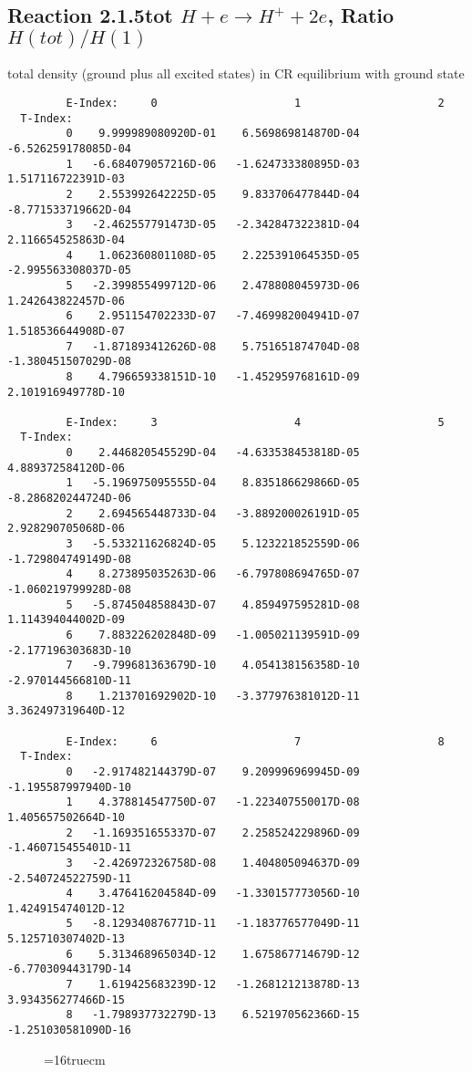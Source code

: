 \documentclass[12pt,dvipdfmx]{article}
\begin{document}
\newpage
\subsection{
Reaction 2.1.5tot $ H + e \rightarrow H^+ + 2e$, Ratio $H(tot)/H(1)$
}

total density (ground plus all excited states) in CR equilibrium with ground state

\begin{small}\begin{verbatim}
         E-Index:     0                     1                     2
  T-Index:
         0    9.999989080920D-01    6.569869814870D-04   -6.526259178085D-04
         1   -6.684079057216D-06   -1.624733380895D-03    1.517116722391D-03
         2    2.553992642225D-05    9.833706477844D-04   -8.771533719662D-04
         3   -2.462557791473D-05   -2.342847322381D-04    2.116654525863D-04
         4    1.062360801108D-05    2.225391064535D-05   -2.995563308037D-05
         5   -2.399855499712D-06    2.478808045973D-06    1.242643822457D-06
         6    2.951154702233D-07   -7.469982004941D-07    1.518536644908D-07
         7   -1.871893412626D-08    5.751651874704D-08   -1.380451507029D-08
         8    4.796659338151D-10   -1.452959768161D-09    2.101916949778D-10

         E-Index:     3                     4                     5
  T-Index:
         0    2.446820545529D-04   -4.633538453818D-05    4.889372584120D-06
         1   -5.196975095555D-04    8.835186629866D-05   -8.286820244724D-06
         2    2.694565448733D-04   -3.889200026191D-05    2.928290705068D-06
         3   -5.533211626824D-05    5.123221852559D-06   -1.729804749149D-08
         4    8.273895035263D-06   -6.797808694765D-07   -1.060219799928D-08
         5   -5.874504858843D-07    4.859497595281D-08    1.114394044002D-09
         6    7.883226202848D-09   -1.005021139591D-09   -2.177196303683D-10
         7   -9.799681363679D-10    4.054138156358D-10   -2.970144566810D-11
         8    1.213701692902D-10   -3.377976381012D-11    3.362497319640D-12

         E-Index:     6                     7                     8
  T-Index:
         0   -2.917482144379D-07    9.209996969945D-09   -1.195587997940D-10
         1    4.378814547750D-07   -1.223407550017D-08    1.405657502664D-10
         2   -1.169351655337D-07    2.258524229896D-09   -1.460715455401D-11
         3   -2.426972326758D-08    1.404805094637D-09   -2.540724522759D-11
         4    3.476416204584D-09   -1.330157773056D-10    1.424915474012D-12
         5   -8.129340876771D-11   -1.183776577049D-11    5.125710307402D-13
         6    5.313468965034D-12    1.675867714679D-12   -6.770309443179D-14
         7    1.619425683239D-12   -1.268121213878D-13    3.934356277466D-15
         8   -1.798937732279D-13    6.521970562366D-15   -1.251030581090D-16

\end{verbatim}\end{small}
\begin{figure} \label{2.1.5tot}
\epsfxsize=16truecm
\end{figure}
\end{document}
